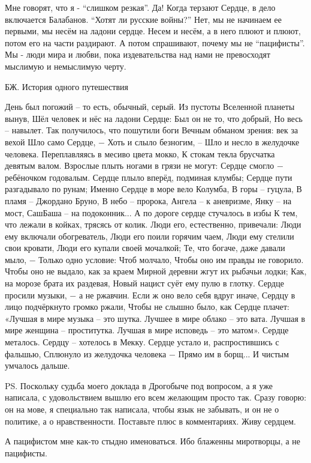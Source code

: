 Мне говорят, что я - \enquote{слишком резкая}. Да! Когда  терзают Сердце, в дело
включается Балабанов. \enquote{Хотят ли русские войны?} Нет, мы не начинаем ее первыми,
мы несём на ладони сердце. Несем и несём, а в него плюют и плюют, потом его на
части раздирают. А потом спрашивают, почему мы не \enquote{пацифисты}.  Мы - люди мира
и любви, пока издевательства над нами не превосходят мыслимую и немыслимую
черту. 

БЖ. История одного путешествия

\raggedcolumns
\begin{multicols}{2} %
\setlength{\parindent}{0pt}

\obeycr
День был погожий – то есть, обычный, серый.
Из пустоты Вселенной планеты вынув,
Шёл человек и нёс на ладони Сердце:
Был он не то, что добрый, 
Но весь – навылет.
\smallskip
Так получилось, что пошутили боги
Вечным обманом зрения: век за вехой
Шло само Сердце, − 
Хоть и слыло безногим, –
Шло и несло в желудочке человека.
\smallskip
Переплавляясь в месиво цвета мокко,
К стокам текла брусчатка девятым валом.
Взрослые плыть ногами в грязи не могут:
Сердце смогло − ребёночком годовалым.
\smallskip
Сердце плыло вперёд, подминая клумбы;
Сердце пути разгадывало по рунам;
Именно Сердце в море вело Колумба,
В горы – гуцула, 
В пламя – Джордано Бруно,
\smallskip
В небо – пророка, 
Ангела – к аневризме,
Янку – на мост, 
СашБаша – на подоконник...
А по дороге сердце стучалось в избы
К тем, что лежали в койках, трясясь от колик.
\smallskip
Люди его, естественно, привечали:
Люди ему включали обогреватель,
Люди его поили горячим чаем,
Люди ему стелили свои кровати,
\smallskip
Люди его купали своей мочалкой;
Те, что богаче, даже давали мыло, −
Только одно условие:
Чтоб молчало,
Чтобы оно им правды не говорило.
\smallskip
Чтобы оно не выдало, как за краем
Мирной деревни жгут их рыбачьи лодки;
Как, на морозе брата их раздевая,
Новый нацист суёт ему пулю в глотку.
\smallskip
Сердце просили музыки, − а не ржавчин.
Если ж оно вело себя вдруг иначе,
Сердцу в лицо подчёркнуто громко ржали,
Чтобы не слышно было, как Сердце плачет:
\smallskip
«Лучшая в мире музыка – это шутка.
Лучшее в мире облако – это вата.
Лучшая в мире женщина – проститутка.
Лучшая в мире исповедь – это матом».
\smallskip
Сердце металось. 
Сердцу – хотелось в Мекку.
Сердце устало и, распростившись с фальшью,
Сплюнуло из желудочка человека −
Прямо им в борщ...
\smallskip
И чистым умчалось дальше.
\restorecr
\end{multicols} %

PS. Поскольку судьба моего доклада в Дрогобыче под вопросом, а я уже написала,
с удовольствием вышлю его всем желающим просто так. Сразу говорю: он на мове, я
специально так написала, чтобы язык не забывать, и он не о политике, а о
нравственности. Поставьте плюс в комментариях. Живу сердцем. 

А пацифистом мне как-то стыдно именоваться. Ибо блаженны миротворцы, а не
пацифисты.
